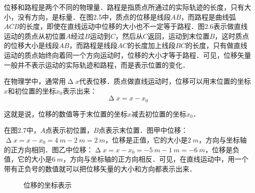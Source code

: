 \begin{Project}
位移和路程是两个不同的物理量．路程是指质点所通过的实际轨迹的长度，只有大小，没有方向，是标量．在图2.5中，质点的位移是线段$AB$，而路程是曲线弧${ACB}$的长度，即使在直线运动中位移的大小也不一定等于路程．图2.6表示做直线运动的质点从初位置$A$经过$B$运动到$C$，然后从$C$返回，运动到末位置$B$，这时质点的位移大小是线段$AB$，而路程是线段$AC$的长度加上线段$BC$的长度，只有做直线运动的质点始终向着同一个方向运动时，位移的大小才等于路程．可见，位移矢量一般并不表示运动的实际轨迹和路程，而是表示位置的变化．
\begin{figure}[H]
    \centering
    \caption{}
\end{figure}

在物理学中，通常用$\upDelta x$代表位移．质点做直线运动时，位移可以用末位置的坐标$x$和初位置的坐标$x_0$表示出来：
\begin{equation}
    \upDelta x=x-x_0
\end{equation}


这就是说，位移的数值等于末位置的坐标$x$减去初位置的坐标$x_0$．


在图2.7中，$A$点表示初位置，$B$点表示末位置．图甲中位移：$\upDelta x=x-x_0=\qty{4}{m}-\qty{2}{m}=\qty{2}{m}$，位移是正值，它的大小是$\qty{2}{m}$，方向与坐标轴的正方向相同．图乙中位移：$\upDelta x=x-x_0=\qty{-5}{m}-\qty{1}{m}=\qty{-6}{m}$，位移是负值，它的大小是$\qty{6}{m}$，方向与坐标轴的正方向相反．可见，在直线运动中，用一个带有正负号的数值就可以把位移矢量的大小和方向都表示出来．

\begin{figure}[H]
    \centering
    \caption{位移的坐标表示}
\end{figure}


\end{Project}
